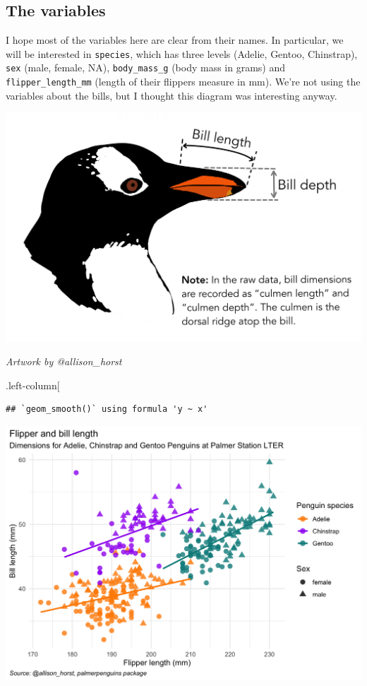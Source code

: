 \documentclass[
  openany]{book}
\begin{document}
\hypertarget{the-variables}{%
\subsection{The variables}\label{the-variables}}

I hope most of the variables here are clear from their names. In particular, we will be interested in \texttt{species}, which has three levels (Adelie, Gentoo, Chinstrap), \texttt{sex} (male, female, NA), \texttt{body\_mass\_g} (body mass in grams) and \texttt{flipper\_length\_mm} (length of their flippers measure in mm). We're not using the variables about the bills, but I thought this diagram was interesting anyway.

\begin{center}\includegraphics[width=0.4\linewidth]{images/m1/culmen_depth} \end{center}

\emph{Artwork by @allison\_horst}

.left-column{[}

\begin{verbatim}
## `geom_smooth()` using formula 'y ~ x'
\end{verbatim}

\begin{center}\includegraphics[width=0.9\linewidth]{images/m1/ah_plot} \end{center}
\end{document}
